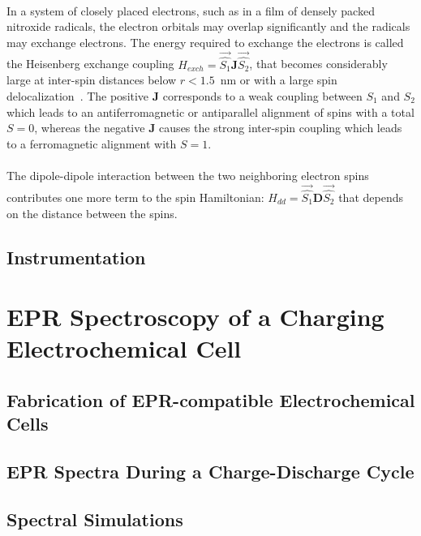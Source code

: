 \paragraph*{}
In a system of closely placed electrons, such as in a film of densely packed nitroxide radicals, the electron orbitals may overlap significantly and the radicals may exchange electrons. The energy required to exchange the electrons is called the Heisenberg exchange coupling $H_{exch} = \vec{\hat{S_1}}\textbf{J}\vec{\hat{S_2}}$, that becomes considerably large at inter-spin distances below $r<1.5$~nm or with a large spin delocalization~\cite{Schweiger2001_exch}. The positive $\textbf{J}$ corresponds to a weak coupling between $S_1$ and $S_2$ which leads to an antiferromagnetic or antiparallel alignment of spins with a total $S=0$, whereas the negative $\textbf{J}$ causes the strong inter-spin coupling which leads to a ferromagnetic alignment with $S=1$.

\paragraph*{}
The dipole-dipole interaction between the two neighboring electron spins contributes one more term to the spin Hamiltonian: $H_{dd} = \vec{\hat{S_1}}\textbf{D}\vec{\hat{S_2}}$ that depends on the distance between the spins. 

\subsection{Instrumentation}

\section{EPR Spectroscopy of a Charging Electrochemical Cell}

\subsection{Fabrication of EPR-compatible Electrochemical Cells}

\subsection{EPR Spectra During a Charge-Discharge Cycle}

\subsection{Spectral Simulations}


